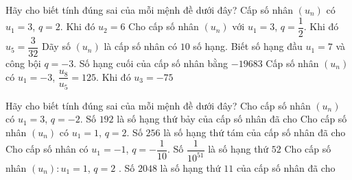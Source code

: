 \begin{ex}%
 Hãy cho biết tính đúng sai của mỗi mệnh đề  dưới đây?
  \choiceTF
  {\True Cấp số nhân $\left(u_n\right)$ có $u_1=3$, $q=2$. Khi đó $u_2=6$} 
   {Cho cấp số nhân $\left(u_n\right)$ với $u_1=3$, $q=\dfrac{1}{2}$. Khi đó $u_5=\dfrac{3}{32}$}
  {Dãy số $\left(u_n\right)$ là cấp số nhân có $10$ số hạng. Biết  số hạng đầu $u_1=7$ và công bội $q=-3$. Số hạng cuối của cấp số nhân bằng $-19683$}
  {\True Cấp số nhân  $(u_n)$ có $u_1=-3$, $\dfrac{u_8}{u_5}=125$. Khi đó $u_3=-75$}
\end{ex}

\begin{ex}%
 Hãy  cho biết tính đúng sai của mỗi mệnh đề dưới đây?
  \choiceTF
  {\True Cho cấp số nhân $\left(u_n\right)$ có  $u_1=3$, $q=-2$. Số $192$ là số hạng thứ bảy của cấp số nhân đã cho}
  {Cho cấp  số nhân $\left(u_{n}\right)$ có $u_1=1$, $q=2$. Số $256$ là số hạng thứ tám của cấp số nhân đã cho}
  {\True Cho cấp số nhân có $u_1=-1$, $q=-\dfrac{1}{10}$. Số $\dfrac{1}{10^{51}}$ là  số hạng thứ $52$}
  {Cho cấp  số nhân $\left(u_{n}\right):u_{1}=1$, $q=2$ . Số $2048$ là số hạng thứ $11$ của cấp số nhân đã cho}
\end{ex}

